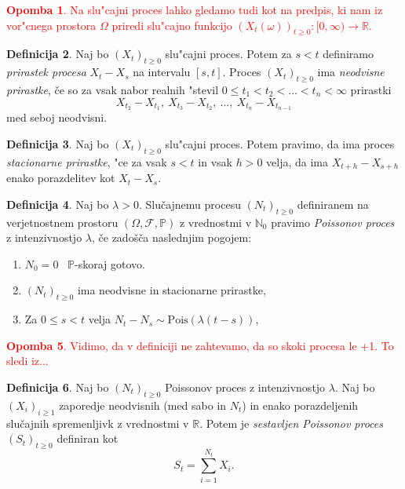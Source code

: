 \documentclass[12pt, a4paper, reqno]{amsart}
\theoremstyle{definition} %
\newtheorem{definicija}{Definicija}[section]
\newtheorem{opomba}[definicija]{Opomba}
\theoremstyle{plain} %
\newcommand{\N}{\mathbb{N}}
\newcommand{\Prob}{\mathbb{P}}
\newcommand{\1}{\mathds{1}}
\newcommand{\Pois}[1]{\text{Pois}(#1)}
\begin{document}
\textcolor{red}{
    \begin{opomba}
        Na slu"cajni proces lahko gledamo tudi kot na predpis, ki nam iz vor"cnega prostora 
        $\Omega$ priredi slu"cajno funkcijo
        $(X_t(\omega))_{t\geq0}: [0, \infty) \rightarrow \mathbb{R}$.
        \label{op:slucFunkc}
    \end{opomba}
}
    \begin{definicija}
        Naj bo $(X_t)_{t\geq0}$ slu"cajni proces. Potem za $s < t$ definiramo
        \textit{prirastek procesa} $X_t - X_s$ na intervalu $[s, t]$. Proces $(X_t)_{t\geq0}$ ima 
        \textit{neodvisne prirastke}, če so za vsak nabor realnih "stevil
        $0 \leq t_1 < t_2 < \ldots < t_n < \infty$ prirastki
        $$
            X_{t_2} - X_{t_1}, \ X_{t_3} - X_{t_2}, \ \ldots, \ X_{t_n} - X_{t_{n-1}}
        $$
        med seboj neodvisni.
        \label{def:prirastek}
    \end{definicija}

    \begin{definicija}
        Naj bo $(X_t)_{t\geq0}$ slu"cajni proces. Potem pravimo, da ima proces
        \textit{stacionarne prirastke}, "ce za vsak $s < t$ in vsak $h > 0$ velja, 
        da ima $X_{t+h} - X_{s+h}$ enako porazdelitev kot $X_t - X_s$.
        \label{def:stacPrir}
    \end{definicija}

    \begin{definicija}
        Naj bo $\lambda > 0$. Slučajnemu procesu $(N_t)_{t\geq 0}$ definiranem na verjetnostnem 
        prostoru $(\Omega, \mathcal{F}, \mathbb{P})$ z vrednostmi v $\N_0$ pravimo 
        \textit{Poissonov proces} z intenzivnostjo $\lambda$, če zadošča naslednjim pogojem:
        \begin{enumerate}
            \item $N_0 = 0$ \ $\Prob$-skoraj gotovo.
            \item $(N_t)_{t\geq 0}$ ima neodvisne in stacionarne prirastke,
            \item Za $0 \leq s < t$ velja $ N_t - N_s \sim\Pois{\lambda(t - s)}$,
        \end{enumerate}
        \label{def:HPP}
    \end{definicija}
\textcolor{red}{
    \begin{opomba}
        Vidimo, da v definiciji ne zahtevamo, da so skoki procesa le +1. To sledi iz...
        \label{op:skoki}
    \end{opomba}
}
    \begin{definicija}
        Naj bo $(N_t)_{t\geq0}$ Poissonov proces z intenzivnostjo $\lambda$. 
        Naj bo $(X_i)_{i\geq1}$ zaporedje neodvisnih (med sabo in $N_t$) in enako 
        porazdeljenih slučajnih spremenljivk z vrednostmi v $\mathbb{R}$. Potem je 
        \textit{sestavljen Poissonov proces} $(S_t)_{t\geq0}$ definiran kot
        $$
            S_t = \sum_{i=1}^{N_t} X_i.
        $$
        \label{def:CPP}
    \end{definicija}
\end{document}
